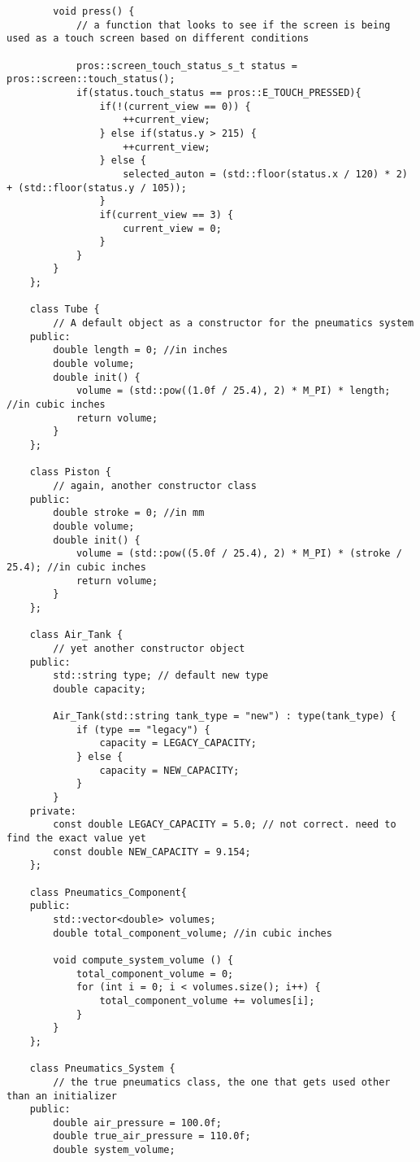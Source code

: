 \begin{verbatim}
        void press() {
            // a function that looks to see if the screen is being used as a touch screen based on different conditions

            pros::screen_touch_status_s_t status = pros::screen::touch_status();
            if(status.touch_status == pros::E_TOUCH_PRESSED){
                if(!(current_view == 0)) {
                    ++current_view;
                } else if(status.y > 215) {
                    ++current_view;
                } else {
                    selected_auton = (std::floor(status.x / 120) * 2) + (std::floor(status.y / 105));
                }
                if(current_view == 3) {
                    current_view = 0;
                }
            }
        }
    };

    class Tube {
        // A default object as a constructor for the pneumatics system
    public:
        double length = 0; //in inches
        double volume;
        double init() {
            volume = (std::pow((1.0f / 25.4), 2) * M_PI) * length; //in cubic inches
            return volume;
        }
    };

    class Piston {
        // again, another constructor class
    public:
        double stroke = 0; //in mm
        double volume;
        double init() {
            volume = (std::pow((5.0f / 25.4), 2) * M_PI) * (stroke / 25.4); //in cubic inches
            return volume;
        }
    };

    class Air_Tank {
        // yet another constructor object
    public:
        std::string type; // default new type
        double capacity;
        
        Air_Tank(std::string tank_type = "new") : type(tank_type) {
            if (type == "legacy") {
                capacity = LEGACY_CAPACITY;
            } else {
                capacity = NEW_CAPACITY;
            }
        }
    private:
        const double LEGACY_CAPACITY = 5.0; // not correct. need to find the exact value yet
        const double NEW_CAPACITY = 9.154;
    };

    class Pneumatics_Component{
    public:
        std::vector<double> volumes;
        double total_component_volume; //in cubic inches

        void compute_system_volume () {
            total_component_volume = 0;
            for (int i = 0; i < volumes.size(); i++) {
                total_component_volume += volumes[i];
            }
        }
    };

    class Pneumatics_System {
        // the true pneumatics class, the one that gets used other than an initializer
    public:
        double air_pressure = 100.0f;
        double true_air_pressure = 110.0f;
        double system_volume;


\end{verbatim}
